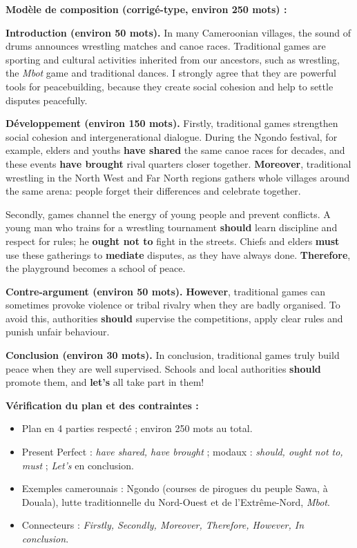 \documentclass[11pt]{article}
\begin{document}
\begin{corrige}

\textbf{Modèle de composition (corrigé-type, environ 250 mots) :}

\textbf{Introduction (environ 50 mots).}
In many Cameroonian villages, the sound of drums announces wrestling matches and canoe races. Traditional games are sporting and cultural activities inherited from our ancestors, such as wrestling, the \emph{Mbot} game and traditional dances. I strongly agree that they are powerful tools for peacebuilding, because they create social cohesion and help to settle disputes peacefully.

\textbf{Développement (environ 150 mots).}
Firstly, traditional games strengthen social cohesion and intergenerational dialogue. During the Ngondo festival, for example, elders and youths \textbf{have shared} the same canoe races for decades, and these events \textbf{have brought} rival quarters closer together. \textbf{Moreover}, traditional wrestling in the North West and Far North regions gathers whole villages around the same arena: people forget their differences and celebrate together.

Secondly, games channel the energy of young people and prevent conflicts. A young man who trains for a wrestling tournament \textbf{should} learn discipline and respect for rules; he \textbf{ought not to} fight in the streets. Chiefs and elders \textbf{must} use these gatherings to \textbf{mediate} disputes, as they have always done. \textbf{Therefore}, the playground becomes a school of peace.

\textbf{Contre-argument (environ 50 mots).}
\textbf{However}, traditional games can sometimes provoke violence or tribal rivalry when they are badly organised. To avoid this, authorities \textbf{should} supervise the competitions, apply clear rules and punish unfair behaviour.

\textbf{Conclusion (environ 30 mots).}
In conclusion, traditional games truly build peace when they are well supervised. Schools and local authorities \textbf{should} promote them, and \textbf{let's} all take part in them!

\textbf{Vérification du plan et des contraintes :}
\begin{itemize}
\item Plan en 4 parties respecté ; environ 250 mots au total.
\item Present Perfect : \emph{have shared, have brought} ; modaux : \emph{should, ought not to, must} ; \emph{Let's} en conclusion.
\item Exemples camerounais : Ngondo (courses de pirogues du peuple Sawa, à Douala), lutte traditionnelle du Nord-Ouest et de l'Extrême-Nord, \emph{Mbot}.
\item Connecteurs : \emph{Firstly, Secondly, Moreover, Therefore, However, In conclusion}.
\end{itemize}


\end{corrige}
\end{document}
